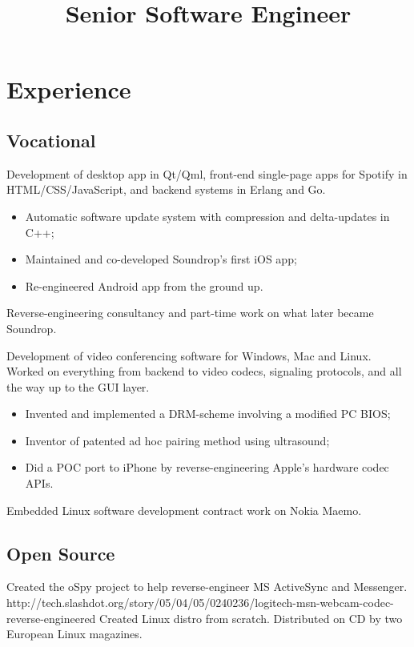 \documentclass[11pt,a4paper,sans]{moderncv}
\title{Senior Software Engineer}
\begin{document}
\makecvtitle

\section{Experience}
\subsection{Vocational}
{Development of desktop app in Qt/Qml, front-end single-page apps for Spotify
in HTML/CSS/JavaScript, and backend systems in Erlang and Go.
\begin{itemize}
\item Automatic software update system with compression and delta-updates in C++;
\item Maintained and co-developed Soundrop's first iOS app;
\item Re-engineered Android app from the ground up.
\end{itemize}}
{Reverse-engineering consultancy and part-time work on what later became Soundrop.}
{Development of video conferencing software for Windows, Mac and Linux.
Worked on everything from backend to video codecs, signaling protocols, and all
the way up to the GUI layer.
\begin{itemize}
\item Invented and implemented a DRM-scheme involving a modified PC BIOS;
\item Inventor of patented ad hoc pairing method using ultrasound;
\item Did a POC port to iPhone by reverse-engineering Apple's hardware codec APIs.
\end{itemize}}
{Embedded Linux software development contract work on Nokia Maemo.}
\subsection{Open Source}
{Created the oSpy project to help reverse-engineer MS ActiveSync and Messenger.}
{http://tech.slashdot.org/story/05/04/05/0240236/logitech-msn-webcam-codec-reverse-engineered}
{Created Linux distro from scratch. Distributed on CD by two European Linux magazines.}

\nocite{*}


\end{document}
